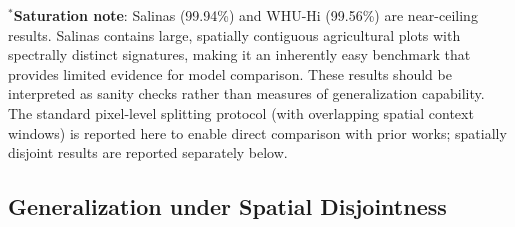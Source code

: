 \documentclass[pdflatex,sn-mathphys-num]{sn-jnl}
\theoremstyle{thmstyleone}
\theoremstyle{thmstyletwo}
\theoremstyle{thmstylethree}
\begin{document}
\begin{table}[!t]
\caption{Overall Classification Performance (5 Runs, Mean $\pm$ Std)}
\label{tab:overall_results}
\centering
{}
\begin{flushleft}
\footnotesize{$^*$\textbf{Saturation note}: Salinas (99.94\%) and WHU-Hi (99.56\%) are near-ceiling results. Salinas contains large, spatially contiguous agricultural plots with spectrally distinct signatures, making it an inherently easy benchmark that provides limited evidence for model comparison. These results should be interpreted as sanity checks rather than measures of generalization capability. The standard pixel-level splitting protocol (with overlapping spatial context windows) is reported here to enable direct comparison with prior works; spatially disjoint results are reported separately below.}
\end{flushleft}
\end{table}

\subsection{Generalization under Spatial Disjointness}
\end{document}
